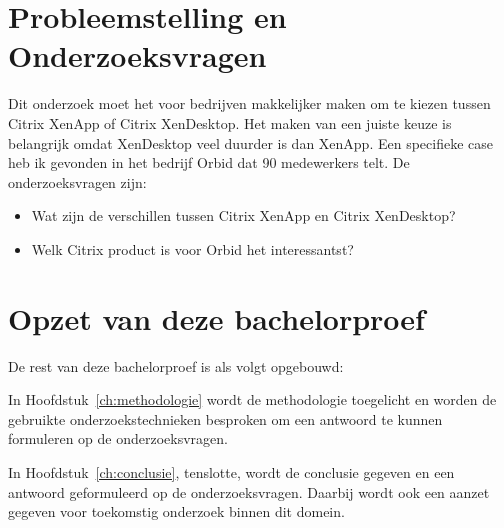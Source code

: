 \section{Probleemstelling en Onderzoeksvragen}
\label{sec:onderzoeksvragen}

Dit onderzoek moet het voor bedrijven makkelijker maken om te kiezen tussen Citrix XenApp of Citrix XenDesktop. Het maken van een juiste keuze is belangrijk omdat XenDesktop veel duurder is dan XenApp. Een specifieke case heb ik gevonden in het bedrijf Orbid dat 90 medewerkers telt. De onderzoeksvragen zijn:

\begin{itemize}
\item Wat zijn de verschillen tussen Citrix XenApp en Citrix XenDesktop?
\item Welk Citrix product is voor Orbid het interessantst?
\end{itemize}

\section{Opzet van deze bachelorproef}
\label{sec:opzet-bachelorproef}


De rest van deze bachelorproef is als volgt opgebouwd:

In Hoofdstuk~\ref{ch:methodologie} wordt de methodologie toegelicht en worden de gebruikte onderzoekstechnieken besproken om een antwoord te kunnen formuleren op de onderzoeksvragen.


In Hoofdstuk~\ref{ch:conclusie}, tenslotte, wordt de conclusie gegeven en een antwoord geformuleerd op de onderzoeksvragen. Daarbij wordt ook een aanzet gegeven voor toekomstig onderzoek binnen dit domein.


